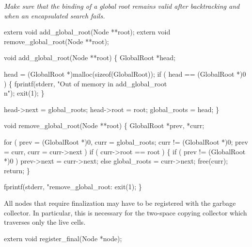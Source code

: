 \emph{Make sure that the binding of a global root remains valid
after backtracking and when an encapsulated search fails.}

\nwenddocs{}\plusendmoddef\nwstartdeflinemarkup{}\nwenddeflinemarkup
extern void add_global_root(Node **root);
extern void remove_global_root(Node **root);

\nwendcode{}\nwdocspar
\nwenddocs{}\plusendmoddef\nwstartdeflinemarkup{}\nwenddeflinemarkup
void
add_global_root(Node **root)
\{
    GlobalRoot *head;

    head = (GlobalRoot *)malloc(sizeof(GlobalRoot));
    if ( head == (GlobalRoot *)0 )
    \{
        fprintf(stderr, "Out of memory in add_global_root\\n");
        exit(1);
    \}

    head->next   = global_roots;
    head->root   = root;
    global_roots = head;
\}

void
remove_global_root(Node **root)
\{
    GlobalRoot *prev, *curr;

    for ( prev = (GlobalRoot *)0, curr = global_roots;
          curr != (GlobalRoot *)0;
          prev = curr, curr = curr->next )
        if ( curr->root == root )
        \{
            if ( prev != (GlobalRoot *)0 )
                prev->next = curr->next;
            else
                global_roots = curr->next;
            free(curr);
            return;
        \}

    fprintf(stderr, "remove_global_root: %
    exit(1);
\}

\nwendcode{}\nwdocspar
All nodes that require finalization may have to be registered with the
garbage collector. In particular, this is necessary for the two-space
copying collector which traverses only the live cells.

\nwenddocs{}\plusendmoddef\nwstartdeflinemarkup{}\nwenddeflinemarkup
extern void register_final(Node *node);


